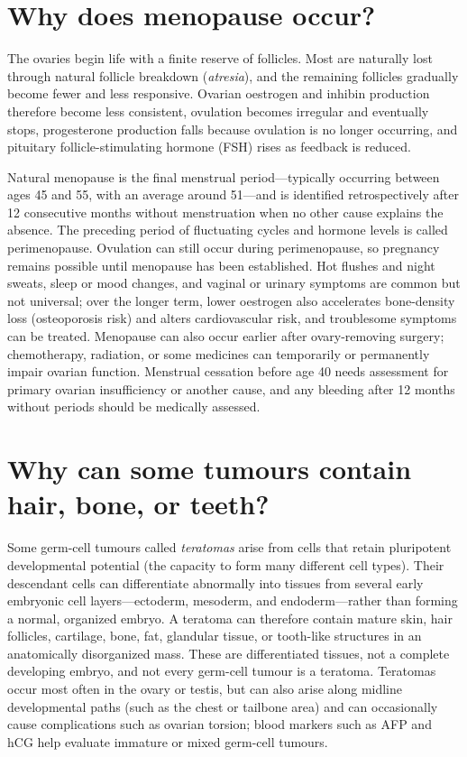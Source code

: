 \documentclass[11pt,oneside]{report}
\begin{document}
\section{Why does menopause occur?}

The ovaries begin life with a finite reserve of follicles. Most are naturally
lost through natural follicle breakdown (\emph{atresia}), and the remaining
follicles gradually become fewer and less responsive. Ovarian oestrogen and
inhibin production therefore become less consistent, ovulation becomes
irregular and eventually stops, progesterone production falls because ovulation
is no longer occurring, and pituitary follicle-stimulating hormone (FSH) rises
as feedback is reduced.

Natural menopause is the final menstrual period---typically occurring between
ages 45 and 55, with an average around 51---and is identified retrospectively
after 12 consecutive months without menstruation when no other cause explains
the absence. The preceding period of fluctuating cycles and
hormone levels is called perimenopause. Ovulation can still occur during
perimenopause, so pregnancy remains possible until menopause has been
established. Hot flushes and night sweats, sleep or mood changes, and vaginal or
urinary symptoms are common but not universal; over the longer term, lower
oestrogen also accelerates bone-density loss (osteoporosis risk) and alters
cardiovascular risk, and troublesome symptoms can be treated. Menopause can also occur earlier after ovary-removing surgery;
chemotherapy, radiation, or some medicines can temporarily or permanently
impair ovarian function. Menstrual cessation before age 40 needs assessment for
primary ovarian insufficiency or another cause, and any bleeding after 12 months
without periods should be medically assessed.

\section{Why can some tumours contain hair, bone, or teeth?}

Some germ-cell tumours called \emph{teratomas} arise from cells that retain
pluripotent developmental potential (the capacity to form many different cell
types). Their descendant cells can differentiate abnormally into tissues from
several early embryonic cell layers---ectoderm, mesoderm, and endoderm---rather
than forming a normal, organized embryo. A teratoma can therefore contain mature
skin, hair follicles, cartilage, bone, fat, glandular tissue, or tooth-like
structures in an anatomically disorganized mass. These are differentiated
tissues, not a complete developing embryo, and not every germ-cell tumour is a
teratoma. Teratomas occur most often in the ovary or testis, but can also arise
along midline developmental paths (such as the chest or tailbone area) and can
occasionally cause complications such as ovarian torsion; blood markers such as
AFP and hCG help evaluate immature or mixed germ-cell tumours.
\end{document}
